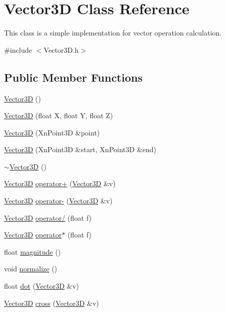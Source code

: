 \hypertarget{classVector3D}{
\section{Vector3D Class Reference}
\label{classVector3D}
}


This class is a simple implementation for vector operation calculation.  




{\ttfamily \#include $<$Vector3D.h$>$}

\subsection*{Public Member Functions}
\begin{DoxyCompactItemize}
\item 
\hyperlink{classVector3D_a0b11a8d75da427b27443d8a94d0d296c}{Vector3D} ()
\item 
\hyperlink{classVector3D_a78942f6189eb0d5fbf0807b618989dc7}{Vector3D} (float X, float Y, float Z)
\item 
\hyperlink{classVector3D_ac20c5842aab3efc1849fa8574f0dc4ff}{Vector3D} (XnPoint3D \&point)
\item 
\hyperlink{classVector3D_affff1bab0dfa4dba55acd5cadafb5fcc}{Vector3D} (XnPoint3D \&start, XnPoint3D \&end)
\item 
\hyperlink{classVector3D_ae4fde5759270bf5bcf615f12f0823a8c}{$\sim$Vector3D} ()
\item 
\hyperlink{classVector3D}{Vector3D} \hyperlink{classVector3D_aee27c6e25d5975d5ae9cf2066359e656}{operator+} (\hyperlink{classVector3D}{Vector3D} \&v)
\item 
\hyperlink{classVector3D}{Vector3D} \hyperlink{classVector3D_a150eaa071600434aa7a6128218128e59}{operator-\/} (\hyperlink{classVector3D}{Vector3D} \&v)
\item 
\hyperlink{classVector3D}{Vector3D} \hyperlink{classVector3D_ac0335249709d2e203c2871c7310aa475}{operator/} (float f)
\item 
\hyperlink{classVector3D}{Vector3D} \hyperlink{classVector3D_a5a36ff390f5954f79687a3921e031553}{operator$\ast$} (float f)
\item 
float \hyperlink{classVector3D_a1139cce4839680afb01a9612eda6e117}{magnitude} ()
\item 
void \hyperlink{classVector3D_abfb12ecb9c9beb88e095cc4a1a512d3c}{normalize} ()
\item 
float \hyperlink{classVector3D_a4c7a7f410edb124026448080f6f0d72a}{dot} (\hyperlink{classVector3D}{Vector3D} \&v)
\item 
\hyperlink{classVector3D}{Vector3D} \hyperlink{classVector3D_aae87a11cc2fc08fdcde299dc50c23fe1}{cross} (\hyperlink{classVector3D}{Vector3D} \&v)
\end{DoxyCompactItemize}
